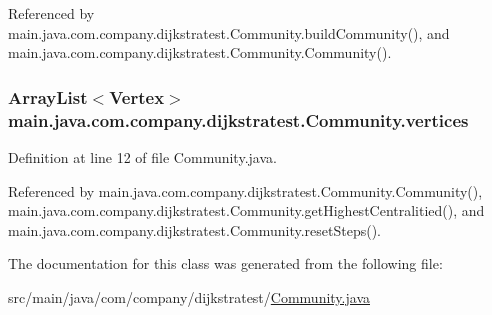 Referenced by main.\-java.\-com.\-company.\-dijkstratest.\-Community.\-build\-Community(), and main.\-java.\-com.\-company.\-dijkstratest.\-Community.\-Community().

\hypertarget{classmain_1_1java_1_1com_1_1company_1_1dijkstratest_1_1_community_a00e314391bafea784ad183152dcd6091}{
\subsubsection[{vertices}]{\setlength{\rightskip}{0pt plus 5cm}Array\-List$<${\bf Vertex}$>$ main.\-java.\-com.\-company.\-dijkstratest.\-Community.\-vertices\hspace{0.3cm}{\ttfamily [private]}}}\label{classmain_1_1java_1_1com_1_1company_1_1dijkstratest_1_1_community_a00e314391bafea784ad183152dcd6091}


Definition at line 12 of file Community.\-java.



Referenced by main.\-java.\-com.\-company.\-dijkstratest.\-Community.\-Community(), main.\-java.\-com.\-company.\-dijkstratest.\-Community.\-get\-Highest\-Centralitied(), and main.\-java.\-com.\-company.\-dijkstratest.\-Community.\-reset\-Steps().



The documentation for this class was generated from the following file\-:\begin{DoxyCompactItemize}
\item 
src/main/java/com/company/dijkstratest/\hyperlink{_community_8java}{Community.\-java}\end{DoxyCompactItemize}
